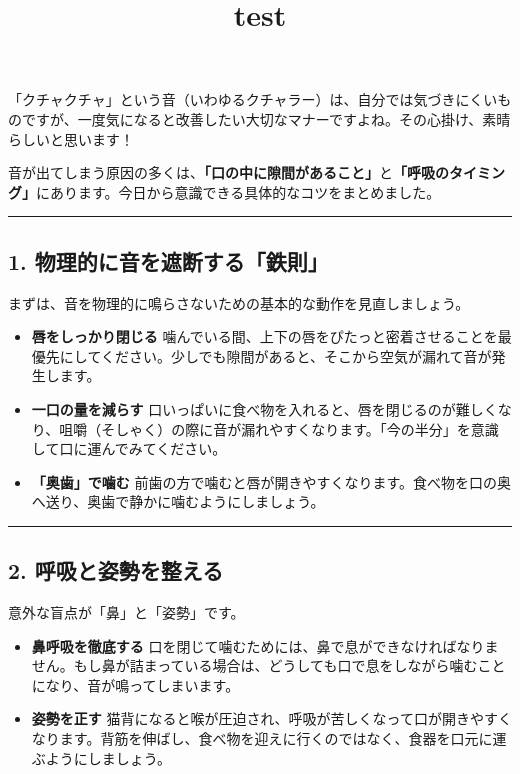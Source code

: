 \documentclass[
]{article}
\title{test}
\author{}
\date{\vspace{-2.5em}}
\providecommand{\tightlist}{%
  \setlength{\itemsep}{0pt}\setlength{\parskip}{0pt}}
\begin{document}
\maketitle

「クチャクチャ」という音（いわゆるクチャラー）は、自分では気づきにくいものですが、一度気になると改善したい大切なマナーですよね。その心掛け、素晴らしいと思います！

音が出てしまう原因の多くは、\textbf{「口の中に隙間があること」}と\textbf{「呼吸のタイミング」}にあります。今日から意識できる具体的なコツをまとめました。

\begin{center}\rule{0.5\linewidth}{0.5pt}\end{center}

\subsection{1.
物理的に音を遮断する「鉄則」}\label{ux7269ux7406ux7684ux306bux97f3ux3092ux906eux65adux3059ux308bux9244ux5247}

まずは、音を物理的に鳴らさないための基本的な動作を見直しましょう。

\begin{itemize}
\tightlist
\item
  \textbf{唇をしっかり閉じる}
  噛んでいる間、上下の唇をぴたっと密着させることを最優先にしてください。少しでも隙間があると、そこから空気が漏れて音が発生します。
\item
  \textbf{一口の量を減らす}
  口いっぱいに食べ物を入れると、唇を閉じるのが難しくなり、咀嚼（そしゃく）の際に音が漏れやすくなります。「今の半分」を意識して口に運んでみてください。
\item
  \textbf{「奥歯」で噛む}
  前歯の方で噛むと唇が開きやすくなります。食べ物を口の奥へ送り、奥歯で静かに噛むようにしましょう。
\end{itemize}

\begin{center}\rule{0.5\linewidth}{0.5pt}\end{center}

\subsection{2.
呼吸と姿勢を整える}\label{ux547cux5438ux3068ux59ffux52e2ux3092ux6574ux3048ux308b}

意外な盲点が「鼻」と「姿勢」です。

\begin{itemize}
\tightlist
\item
  \textbf{鼻呼吸を徹底する}
  口を閉じて噛むためには、鼻で息ができなければなりません。もし鼻が詰まっている場合は、どうしても口で息をしながら噛むことになり、音が鳴ってしまいます。
\item
  \textbf{姿勢を正す}
  猫背になると喉が圧迫され、呼吸が苦しくなって口が開きやすくなります。背筋を伸ばし、食べ物を迎えに行くのではなく、食器を口元に運ぶようにしましょう。
\end{itemize}
\end{document}
